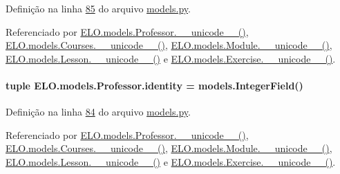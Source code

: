 Definição na linha \hyperlink{ELO_2models_8py_source_l00085}{85} do arquivo \hyperlink{ELO_2models_8py_source}{models.\+py}.



Referenciado por \hyperlink{classELO_1_1models_1_1Professor_a8c0714e4a283c139c0d7aed94a498a7b}{E\+L\+O.\+models.\+Professor.\+\_\+\+\_\+unicode\+\_\+\+\_\+()}, \hyperlink{classELO_1_1models_1_1Courses_a8676cba71b99ab2ba60726b9b5e33825}{E\+L\+O.\+models.\+Courses.\+\_\+\+\_\+unicode\+\_\+\+\_\+()}, \hyperlink{classELO_1_1models_1_1Module_a8fc9fadf09fa7b3bbcfea69ebe25d278}{E\+L\+O.\+models.\+Module.\+\_\+\+\_\+unicode\+\_\+\+\_\+()}, \hyperlink{classELO_1_1models_1_1Lesson_a53e265de97c6b73f262f62a80f9ca994}{E\+L\+O.\+models.\+Lesson.\+\_\+\+\_\+unicode\+\_\+\+\_\+()} e \hyperlink{classELO_1_1models_1_1Exercise_a23f81c66e4d6bc5a4582d74d191f5117}{E\+L\+O.\+models.\+Exercise.\+\_\+\+\_\+unicode\+\_\+\+\_\+()}.

\hypertarget{classELO_1_1models_1_1Professor_a314012619a14c0319c86ba52b6beeb2f}{}
\paragraph[{identity}]{\setlength{\rightskip}{0pt plus 5cm}tuple E\+L\+O.\+models.\+Professor.\+identity = models.\+Integer\+Field()\hspace{0.3cm}{\ttfamily [static]}}\label{classELO_1_1models_1_1Professor_a314012619a14c0319c86ba52b6beeb2f}


Definição na linha \hyperlink{ELO_2models_8py_source_l00084}{84} do arquivo \hyperlink{ELO_2models_8py_source}{models.\+py}.



Referenciado por \hyperlink{classELO_1_1models_1_1Professor_a8c0714e4a283c139c0d7aed94a498a7b}{E\+L\+O.\+models.\+Professor.\+\_\+\+\_\+unicode\+\_\+\+\_\+()}, \hyperlink{classELO_1_1models_1_1Courses_a8676cba71b99ab2ba60726b9b5e33825}{E\+L\+O.\+models.\+Courses.\+\_\+\+\_\+unicode\+\_\+\+\_\+()}, \hyperlink{classELO_1_1models_1_1Module_a8fc9fadf09fa7b3bbcfea69ebe25d278}{E\+L\+O.\+models.\+Module.\+\_\+\+\_\+unicode\+\_\+\+\_\+()}, \hyperlink{classELO_1_1models_1_1Lesson_a53e265de97c6b73f262f62a80f9ca994}{E\+L\+O.\+models.\+Lesson.\+\_\+\+\_\+unicode\+\_\+\+\_\+()} e \hyperlink{classELO_1_1models_1_1Exercise_a23f81c66e4d6bc5a4582d74d191f5117}{E\+L\+O.\+models.\+Exercise.\+\_\+\+\_\+unicode\+\_\+\+\_\+()}.

